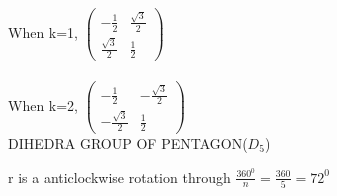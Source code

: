 \documentclass{article}
\begin{document}
When k=1, $\begin{pmatrix}
     - \frac{1}{2} & \frac{\sqrt{3}}{2}\\
    \frac{\sqrt{3}}{2}& \frac{1}{2}
\end{pmatrix}$\\\\

When k=2, 
$\begin{pmatrix}
     - \frac{1}{2} & -\frac{\sqrt{3}}{2}\\
    -\frac{\sqrt{3}}{2}& \frac{1}{2}
\end{pmatrix}$\\


\LARGE{DIHEDRA GROUP OF PENTAGON($D_5$)}
\newcommand{\pentagonDraw}[6]{
\begin{tikzpicture}
\drawGraphNo{3} 
\node (p) [draw,rotate=70,minimum size=3cm,regular polygon, regular polygon sides=#1] at (0,-0.4) {};
\tikzstyle{every node}=[draw,color=black];
\node[anchor=1*(360/9)]at(p.corner 1){$#2$};
\node[anchor=2*(360/9)]at(p.corner 2){$#6$};
\node[anchor=3*(360/9)]at(p.corner 3){$#5$};
\node[anchor=4*(360/9)]at(p.corner 4){$#4$};
\node[anchor=5*(360/9)]at(p.corner 5){$#3$};
\end{tikzpicture}
}

r is a anticlockwise rotation through $\frac{360^0}{n}=\frac{360}{5}=72^0$\\\\
\end{document}
